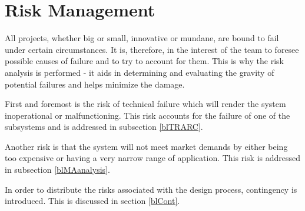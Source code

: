 \chapter{Risk Management}
All projects, whether big or small, innovative or mundane, are bound to fail under certain circumstances. It is, therefore, in the interest of the team to foresee possible causes of failure and to try to account for them. This is why the risk analysis is performed - it aids in determining and evaluating the gravity of potential failures and helps minimize the damage. 

First and foremost is the risk of technical failure which will render the system inoperational or malfunctioning. This risk accounts for the failure of one of the subsystems and is addressed in subsection \ref{blTRARC}.

Another risk is that the system will not meet market demands by either being too expensive or having a very narrow range of application. This risk is addressed in subsection \ref{blMAanalysis}. 

In order to distribute the risks associated with the design process, contingency is introduced. This is discussed in section \ref{blCont}.
